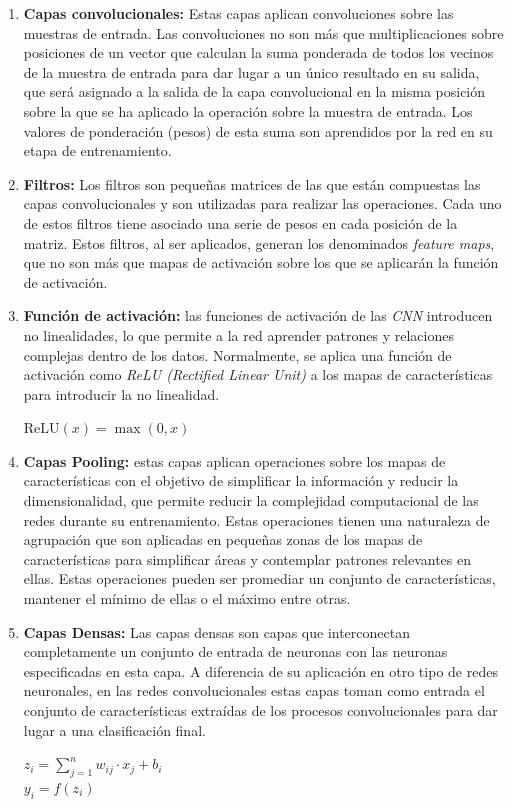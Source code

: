\documentclass{uathesis-es}
\begin{document}
	\begin{enumerate}
		\item \textbf{Capas convolucionales:} Estas capas aplican convoluciones sobre las muestras de entrada. Las convoluciones no son más que multiplicaciones sobre posiciones de un vector que calculan la suma ponderada de todos los vecinos de la muestra de entrada para dar lugar a un único resultado en su salida, que será asignado a la salida de la capa convolucional en la misma posición sobre la que se ha aplicado la operación sobre la muestra de entrada. Los valores de ponderación (pesos) de esta suma son aprendidos por la red en su etapa de entrenamiento.
		
		\item \textbf{Filtros:} Los filtros son pequeñas matrices de las que están compuestas las capas convolucionales y son utilizadas para realizar las operaciones. Cada uno de estos filtros tiene asociado una serie de pesos en cada posición de la matriz. Estos filtros, al ser aplicados, generan los denominados \textit{feature maps}, que no son más que mapas de activación sobre los que se aplicarán la función de activación.
		
		\item \textbf{Función de activación:} las funciones de activación de las \textit{CNN} introducen no linealidades, lo que permite a la red aprender patrones y relaciones complejas dentro de los datos. Normalmente, se aplica una función de activación como \textit{ReLU (Rectified Linear Unit)} a los mapas de características para introducir la no linealidad.
		
		\begin{center}
			$\text{ReLU}(x) = \max(0, x)$
		\end{center}
		
		\item \textbf{Capas Pooling:} estas capas aplican operaciones sobre los mapas de características con el objetivo de simplificar la información y reducir la dimensionalidad, que permite reducir la complejidad computacional de las redes durante su entrenamiento. Estas operaciones tienen una naturaleza de agrupación que son aplicadas en pequeñas zonas de los mapas de características para simplificar áreas y contemplar patrones relevantes en ellas. Estas operaciones pueden ser promediar un conjunto de características, mantener el mínimo de ellas o el máximo entre otras.
		
		\item \textbf{Capas Densas:} Las capas densas son capas que interconectan completamente un conjunto de entrada de neuronas con las neuronas especificadas en esta capa. A diferencia de su aplicación en otro tipo de redes neuronales, en las redes convolucionales estas capas toman como entrada el conjunto de características extraídas de los procesos convolucionales para dar lugar a una clasificación final.
		\begin{center}
			$z_i = \sum_{j=1}^{n} w_{ij} \cdot x_j + b_i$\\
			$y_i = f(z_i)$
		\end{center}
	\end{enumerate}
	
\end{document}
